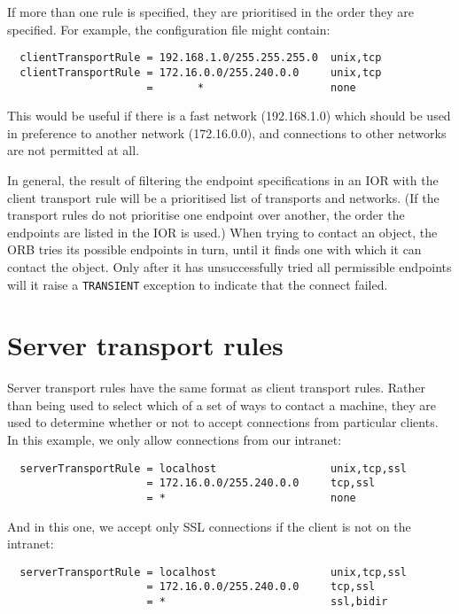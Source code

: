 \documentclass[11pt,oneside,a4paper]{book}
\newcommand{\code}[1]{\texttt{#1}}
\begin{document}
If more than one rule is specified, they are prioritised in the order
they are specified. For example, the configuration file might contain:

\begin{verbatim}
  clientTransportRule = 192.168.1.0/255.255.255.0  unix,tcp
  clientTransportRule = 172.16.0.0/255.240.0.0     unix,tcp
                      =       *                    none
\end{verbatim}

\noindent This would be useful if there is a fast network
(192.168.1.0) which should be used in preference to another network
(172.16.0.0), and connections to other networks are not permitted at
all.

In general, the result of filtering the endpoint specifications in an
IOR with the client transport rule will be a prioritised list of
transports and networks. (If the transport rules do not prioritise one
endpoint over another, the order the endpoints are listed in the IOR
is used.)  When trying to contact an object, the ORB tries its
possible endpoints in turn, until it finds one with which it can
contact the object. Only after it has unsuccessfully tried all
permissible endpoints will it raise a \code{TRANSIENT} exception to
indicate that the connect failed.



\section{Server transport rules}
\label{sec:serverRule}

Server transport rules have the same format as client transport
rules. Rather than being used to select which of a set of ways to
contact a machine, they are used to determine whether or not to accept
connections from particular clients. In this example, we only allow
connections from our intranet:

\begin{verbatim}
  serverTransportRule = localhost                  unix,tcp,ssl
                      = 172.16.0.0/255.240.0.0     tcp,ssl
                      = *                          none
\end{verbatim}

\noindent And in this one, we accept only SSL connections if the
client is not on the intranet:

\begin{verbatim}
  serverTransportRule = localhost                  unix,tcp,ssl
                      = 172.16.0.0/255.240.0.0     tcp,ssl
                      = *                          ssl,bidir
\end{verbatim}
\end{document}
